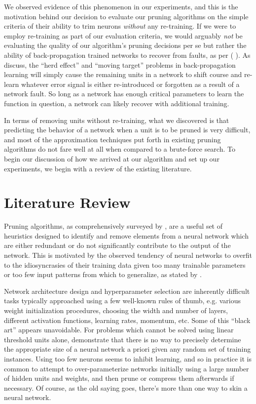 We observed evidence of this phenomenon in our experiments, and this is the motivation behind our decision to evaluate our pruning algorithms on the simple criteria of their ability to trim neurons \textit{without} any re-training. If we were to employ re-training as part of our evaluation criteria, we would arguably \textit{not} be evaluating the quality of our algorithm's pruning decisions per se but rather the ability of back-propagation trained networks to recover from faults, as per (\cite{segee1991fault} \cite{mozer1989skeletonization}). As \cite{fahlman1989cascade} discuss, the ``herd effect'' and ``moving target'' problems in back-propagation learning will simply cause the remaining units in a network to shift course and re-learn whatever error signal is either re-introduced or forgotten as a result of a network fault. So long as a network has enough critical parameters to learn the function in question, a network can likely recover with additional training. 

In terms of removing units without re-training, what we discovered is that predicting the behavior of a network when a unit is to be pruned is very difficult, and most of the approximation techniques put forth in existing pruning algorithms do not fare well at all when compared to a brute-force search. To begin our discussion of how we arrived at our algorithm and set up our experiments, we begin with a review of the existing literature.


\section{Literature Review}
Pruning algorithms, as comprehensively surveyed by \cite{reed1993pruning}, are a useful set of heuristics designed to identify and remove elements from a neural network which are either redundant or do not significantly contribute to the output of the network. This is motivated by the observed tendency of neural networks to overfit to the idiosyncrasies of their training data given too many trainable parameters or too few input patterns from which to generalize, as stated by \cite{chauvin1990generalization}. 

Network architecture design and hyperparameter selection are inherently difficult tasks typically approached using a few well-known rules of thumb, e.g. various weight initialization procedures, choosing the width and number of layers, different activation functions, learning rates, momentum, etc. Some of this ``black art'' appears unavoidable. For problems which cannot be solved using linear threshold units alone, \cite{baum1989size} demonstrate that there is no way to precisely determine the appropriate size of a neural network a priori given any random set of training instances. Using too few neurons seems to inhibit learning, and so in practice it is common to attempt to over-parameterize networks initially using a large number of hidden units and weights, and then prune or compress them afterwards if necessary. Of course, as the old saying goes, there's more than one way to skin a neural network. 

